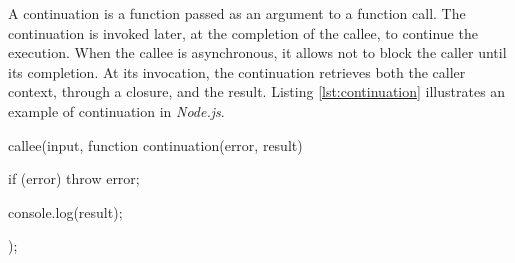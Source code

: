
A continuation is a function passed as an argument to a function call.
The continuation is invoked later, at the completion of the callee, to continue the execution. %
When the callee is asynchronous, it allows not to block the caller until its completion.
At its invocation, the continuation retrieves both the caller context, through a closure, and the result.
Listing \ref{lst:continuation} illustrates an example of continuation in \textit{Node.js}.


\begin{code}[js, %
             caption={Example of a continuation}, %
             label={lst:continuation}] %
callee(input, function continuation(error, result) {
  if (error)
    throw error;
  
  console.log(result);
});
\end{code}


